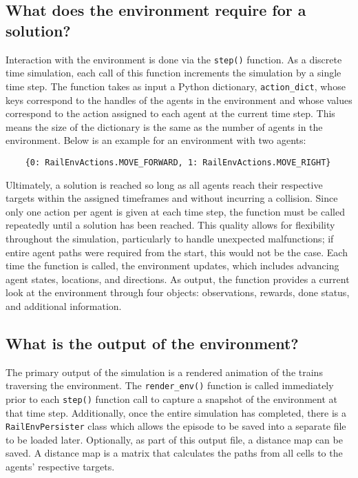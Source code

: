 
\subsection{What does the environment require for a solution?}
Interaction with the environment is done via the \texttt{step()} function.  As a discrete time simulation, each call of this function increments the simulation by a single time step.  
The function takes as input a Python dictionary, \texttt{action\_dict}, whose keys correspond to the handles of the agents in the environment and whose values correspond to the action assigned to each agent at the current time step.  
This means the size of the dictionary is the same as the number of agents in the environment.  
Below is an example for an environment with two agents:
	\begin{verbatim}
	{0: RailEnvActions.MOVE_FORWARD, 1: RailEnvActions.MOVE_RIGHT}
	\end{verbatim}


\noindent Ultimately, a solution is reached so long as all agents reach their respective targets within the assigned timeframes and without incurring a collision.  
Since only one action per agent is given at each time step, the function must be called repeatedly until a solution has been reached.  
This quality allows for flexibility throughout the simulation, particularly to handle unexpected malfunctions; if entire agent paths were required from the start, this would not be the case.  
Each time the function is called, the environment updates, which includes advancing agent states, locations, and directions. 
As output, the function provides a current look at the environment through four objects: observations, rewards, done status, and additional information.

\subsection{What is the output of the environment?}
The primary output of the simulation is a rendered animation of the trains traversing the environment.  
The \texttt{render\_env()} function is called immediately prior to each \texttt{step()} function call to capture a snapshot of the environment at that time step.  
Additionally, once the entire simulation has completed, there is a \texttt{RailEnvPersister} class which allows the episode to be saved into a separate file to be loaded later.  
Optionally, as part of this output file, a distance map can be saved.  A distance map is a matrix that calculates the paths from all cells to the agents' respective targets.

